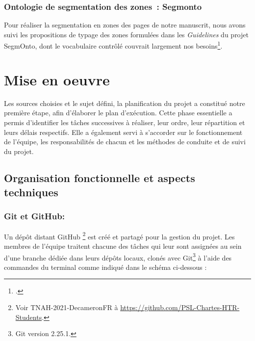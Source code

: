 \documentclass{article}
\begin{document}
\subsubsection{Ontologie de segmentation des zones~: Segmonto}
Pour réaliser la segmentation en zones des pages de notre manuscrit, nous avons suivi les propositions de typage des zones formulées dans les \textit{Guidelines} du projet SegmOnto, dont le vocabulaire contrôlé couvrait largement nos besoins\footcite{campsSegmOntoGuidelines2021}.

\section{Mise en oeuvre}
Les sources choisies et le sujet défini, la planification du projet a constitué notre première étape, afin d’élaborer le plan d'exécution. Cette phase essentielle a permis d'identifier les tâches successives à réaliser, leur ordre, leur répartition et leurs délais respectifs. Elle a également servi à s’accorder sur le fonctionnement de l’équipe, les responsabilités de chacun et les méthodes de conduite et de suivi du projet.
\subsection{Organisation fonctionnelle et aspects techniques}

\subsubsection{Git et GitHub:}

Un dépôt distant GitHub \footnote{Voir TNAH-2021-DecameronFR à \href{https://github.com/PSL-Chartes-HTR-Students}{https://github.com/PSL-Chartes-HTR-Students}.} est créé et partagé pour la gestion du projet. Les membres de l'équipe traitent chacune des tâches qui leur sont assignées au sein d'une branche dédiée dans leurs dépôts locaux, clonés avec Git\footnote{Git version 2.25.1.} à l'aide des commandes du terminal comme indiqué dans le schéma ci-dessous :
\end{document}
